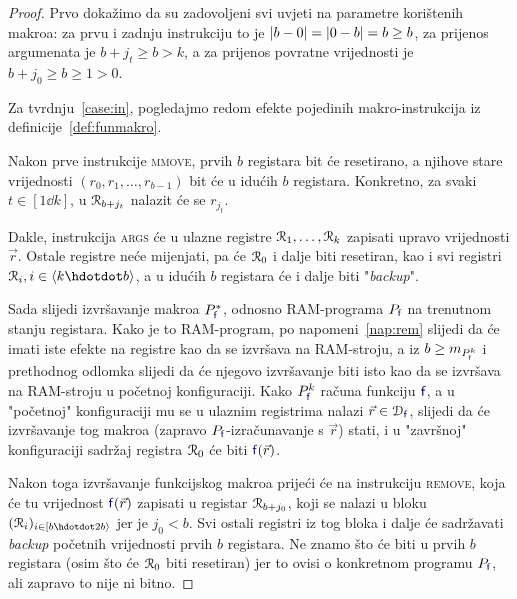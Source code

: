 \begin{proof}
Prvo dokažimo da su zadovoljeni svi uvjeti na parametre korištenih makroa: za prvu i zadnju instrukciju to je $\lvert b-0\rvert=\lvert0-b\rvert=b\ge b$, za prijenos argumenata je $b+j_t\ge b>k$, a za prijenos povratne vrijednosti je $b+j_0\ge b\ge 1>0$.

Za tvrdnju~\ref{case:in}, pogledajmo redom efekte pojedinih makro-instrukcija iz definicije~\ref{def:funmakro}.

	Nakon prve instrukcije \textsc{mmove}, prvih $b$ registara bit će resetirano, a njihove stare vrijednosti $(r_0,r_1,\dots,r_{b-1})$ bit će u idućih $b$ registara. Konkretno, za svaki $t\in[1\dd k]$, u $\mathcal R_{b+j_t}$ nalazit će se $r_{j_t}$.

Dakle, instrukcija \textsc{args} će u ulazne registre $\mathcal R_{1},\dots,\mathcal R_{k}$ zapisati upravo vrijednosti $\vec r$. Ostale registre neće mijenjati, pa će $\mathcal R_{0}$ i dalje biti resetiran, kao i svi registri $\reg{i},i\in\langle k\dd b\rangle$, a u idućih $b$ registara će i dalje biti "\!\emph{backup}".

Sada slijedi izvršavanje makroa $P_{\f{f}}^*$, odnosno RAM-programa $P_{\f{f}}$ na trenutnom stanju registara. Kako je to RAM-program, po napomeni~\ref{nap:rem} slijedi da će imati iste efekte na registre kao da se izvršava na RAM-stroju, a iz $b\ge m_{P_{\f{f}}^k}$ i prethodnog odlomka slijedi da će njegovo izvršavanje biti isto kao da se izvršava na  RAM-stroju u početnoj konfiguraciji. Kako $P_{\f{f}}^k$ računa funkciju $\f{f}$, a u "početnoj" konfiguraciji mu se u ulaznim registrima nalazi $\vec r\in\dom{\f{f}}$, slijedi da će izvršavanje tog makroa  (zapravo $P_{\f{f}}$-izračunavanje s $\vec r$) stati, i u "završnoj" konfiguraciji sadržaj registra $\mathcal R_{0}$ će biti $\f{f}(\vec r)$.

Nakon toga izvršavanje funkcijskog makroa prijeći će na instrukciju \textsc{remove}, koja će tu vrijednost $\f{f}(\vec r)$ zapisati u registar $\mathcal R_{b+j_0}$, koji se nalazi u bloku $(\reg{i})_{i\in[b\dd 2b\rangle}$ jer je $j_0<b$. Svi ostali registri iz tog bloka i dalje će sadržavati \emph{backup} početnih vrijednosti prvih $b$ registara. Ne znamo što će biti u prvih $b$ registara (osim što će $\mathcal R_{0}$ biti resetiran) jer to ovisi o konkretnom programu $P_{\f{f}}$, ali zapravo to nije ni bitno.


\end{proof}
